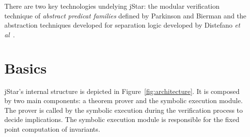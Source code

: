 \documentclass[11pt]{article}
\newcommand{\jStar}{{\sf jStar}}
\begin{document}
There are two key technologies undelying \jStar: the modular
verification technique of {\em abstract predicat families} defined by
Parkinson and Bierman \cite{Parkinson:popl05,PB:popl08} and the abstraction
techniques developed for separation logic developed by
Distefano {\em et al}~\cite{DOY:tacas06}.


\section{Basics}
\label{sec:basics}
\jStar's internal structure is depicted in
Figure~\ref{fig:architecture}.  It is composed by two main
components: a theorem prover and the symbolic execution module. The
prover is called by the symbolic execution during the verification
process to decide implications.  The symbolic execution module is
responsible for the fixed point computation of invariants.
\end{document}
